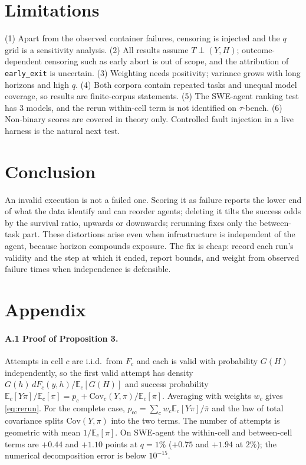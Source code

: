 \documentclass[letterpaper]{article} %
\newcommand{\pb}{\bar\pi}
\begin{document}
\section{Limitations}

(1) Apart from the observed container failures, censoring is injected and the
$q$ grid is a sensitivity analysis. (2) All results assume $T\perp(Y,H)$;
outcome-dependent censoring such as early abort is out of scope, and the
attribution of \texttt{early\_exit} is uncertain. (3) Weighting needs positivity;
variance grows with long horizons and high $q$. (4) Both corpora contain
repeated tasks and unequal model coverage, so results are finite-corpus
statements. (5) The SWE-agent ranking test has 3 models, and the rerun
within-cell term is not identified on $\tau$-bench. (6) Non-binary scores are
covered in theory only. Controlled fault injection in a live harness is the
natural next test.

\section{Conclusion}

An invalid execution is not a failed one. Scoring it as failure reports the
lower end of what the data identify and can reorder agents; deleting it tilts
the success odds by the survival ratio, upwards or downwards; rerunning fixes
only the between-task part. These distortions arise even when infrastructure is
independent of the agent, because horizon compounds exposure. The fix is cheap: record each run's validity and the
step at which it ended, report bounds, and weight from observed failure times
when independence is defensible.



\appendix
\section{Appendix}

\paragraph{A.1 Proof of Proposition 3.} Attempts in cell $c$ are i.i.d.\ from
$F_c$ and each is valid with probability $G(H)$ independently, so the first
valid attempt has density $G(h)\,dF_c(y,h)/\mathbb{E}_c[G(H)]$ and success
probability $\mathbb{E}_c[Y\pi]/\mathbb{E}_c[\pi]=p_c+\mathrm{Cov}_c(Y,\pi)/
\mathbb{E}_c[\pi]$. Averaging with weights $w_c$ gives \eqref{eq:rerun}. For the
complete case, $p_{\mathrm{cc}}=\sum_cw_c\mathbb{E}_c[Y\pi]/\pb$ and the law of
total covariance splits $\mathrm{Cov}(Y,\pi)$ into the two terms. The number of
attempts is geometric with mean $1/\mathbb{E}_c[\pi]$. On SWE-agent the
within-cell and between-cell terms are $+0.44$ and $+1.10$ points at $q=1\%$
($+0.75$ and $+1.94$ at $2\%$); the numerical decomposition error is below
$10^{-15}$.
\end{document}
